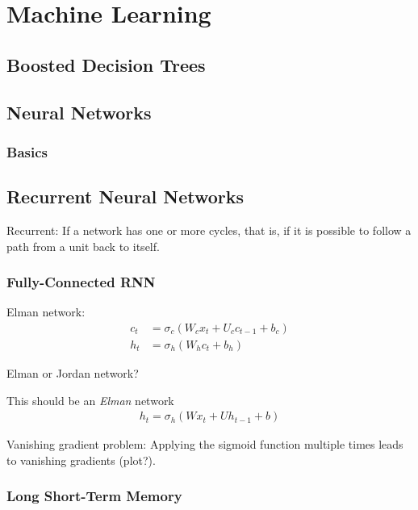 \chapter{Machine Learning}
\label{sec:ml}

\section{Boosted Decision Trees}
\label{sec:bdt}

\section{Neural Networks}
\label{sec:nn}

\subsection{Basics}
\label{sec:nn_basics}

\section{Recurrent Neural Networks}
\label{sec:rnn}

Recurrent: If a network has one or more cycles, that is, if it is possible to
follow a path from a unit back to itself.

\subsection{Fully-Connected RNN}
\label{sec:fully_connected_rnn}

Elman network:
\begin{align}
  c_t &= \sigma_c(W_c x_t + U_c c_{t-1} + b_c) \\
  h_t &= \sigma_h(W_h c_t + b_h)
\end{align}

Elman or Jordan network?

This should be an \emph{Elman} network
\begin{align}
  h_t = \sigma_h(W x_t + U h_{t-1} + b)
\end{align}

Vanishing gradient problem: Applying the sigmoid function multiple times leads
to vanishing gradients (plot?).

\subsection{Long Short-Term Memory}
\label{sec:lstm}

